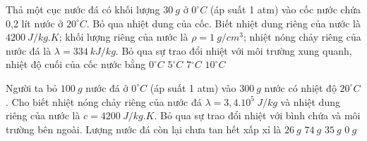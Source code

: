 \begin{ex} 
	Thả một cục nước đá có khối lượng $30 \ g$ ở $0^\circ C$ (áp suất 1 atm) vào cốc nước chứa 0,2 lít nước ở $20^\circ C$. Bỏ qua nhiệt dung của cốc. Biết nhiệt dung riêng của nước là $4200 \ J / kg . K$; khối lượng riêng của nước là $\rho=1 \ g / cm^3$; nhiệt nóng chảy riêng của nước đá là $\lambda=334 \ kJ /kg$. Bỏ qua sự trao đổi nhiệt với môi trường xung quanh, nhiệt độ cuối của cốc nước bằng
	\choice
	{$0^\circ C$}
	{$5^\circ C$}
	{\True $7{}^\circ C$}
	{$10^\circ C$}
\end{ex}
\begin{ex} 
	Người ta bỏ $100 \ g$ nước đá ở $0^\circ C$ (áp suất 1 atm) vào $300 \ g$ nước có nhiệt độ $20^\circ C$. Cho biết nhiệt nóng chảy riêng của nước đá $\lambda=3,4.10^{5} \ J/kg$ và nhiệt dung riêng của nước là $c=4200 \ J/kg.K$. Bỏ qua sự trao đổi nhiệt với bình chứa và môi trường bên ngoài. Lượng nước đá còn lại chưa tan hết xấp xỉ là
	\choice
	{\True $26 \ g$}
	{$74 \ g$}
	{$35 \ g$}
	{$0 \ g$}
\end{ex}

